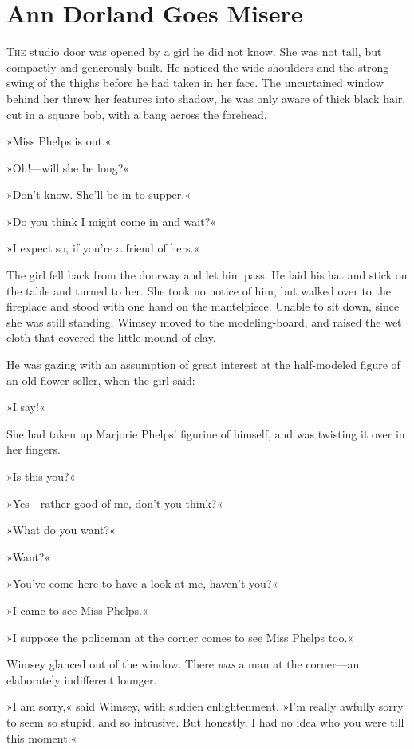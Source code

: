 \chapter{Ann Dorland Goes Misere}

\lettrine[lines=4]{T}{he} studio door was opened by a girl he did not know. She was not tall, but compactly and generously built. He noticed the wide shoulders and the strong swing of the thighs before he had taken in her face. The uncurtained window behind her threw her features into shadow, he was only aware of thick black hair, cut in a square bob, with a bang across the forehead.

»Miss Phelps is out.«

»Oh!—will she be long?«

»Don't know. She'll be in to supper.«

»Do you think I might come in and wait?«

»I expect so, if you're a friend of hers.«

The girl fell back from the doorway and let him pass. He laid his hat and stick on the table and turned to her. She took no notice of him, but walked over to the fireplace and stood with one hand on the mantelpiece. Unable to sit down, since she was still standing, Wimsey moved to the modeling-board, and raised the wet cloth that covered the little mound of clay.

He was gazing with an assumption of great interest at the half-modeled figure of an old flower-seller, when the girl said:

»I say!«

She had taken up Marjorie Phelps' figurine of himself, and was twisting it over in her fingers.

»Is this you?«

»Yes—rather good of me, don't you think?«

»What do you want?«

»Want?«

»You've come here to have a look at me, haven't you?«

»I came to see Miss Phelps.«

»I suppose the policeman at the corner comes to see Miss Phelps too.«

Wimsey glanced out of the window. There \textit{was} a man at the corner—an elaborately indifferent lounger.

»I am sorry,« said Wimsey, with sudden enlightenment. »I'm really awfully sorry to seem so stupid, and so intrusive. But honestly, I had no idea who you were till this moment.«

